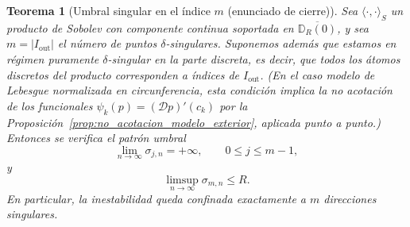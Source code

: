 \documentclass[12pt,a4paper]{article}
\newtheorem{theorem}{Teorema}
\theoremstyle{definition}
\theoremstyle{remark}
\newcommand{\D}{\mathcal{D}}
\begin{document}
\begin{theorem}[Umbral singular en el índice $m$ (enunciado de cierre)]\label{thm:umbral_singular_indice_m_enunciado}
  Sea $\langle\cdot,\cdot\rangle_S$ un producto de Sobolev con componente continua soportada en
  $\overline{\mathbb D_R(0)}$, y sea $m=|I_{\mathrm{out}}|$ el número de puntos $\delta$-singulares.
  Suponemos además que estamos en régimen puramente $\delta$-singular en la parte discreta, es decir,
  que todos los átomos discretos del producto corresponden a índices de $I_{\mathrm{out}}$.
  (En el caso modelo de Lebesgue normalizada en circunferencia, esta condición implica la
  no acotación de los funcionales $\psi_k(p)=(\D p)'(c_k)$ por la
  Proposición~\ref{prop:no_acotacion_modelo_exterior}, aplicada punto a punto.)
  Entonces se verifica el patrón umbral
  \[
    \lim_{n\to\infty}\sigma_{j,n}=+\infty,
    \qquad 0\le j\le m-1,
  \]
  y
  \[
    \limsup_{n\to\infty}\sigma_{m,n}\le R.
  \]
  En particular, la inestabilidad queda confinada exactamente a $m$ direcciones singulares.
\end{theorem}
\end{document}
